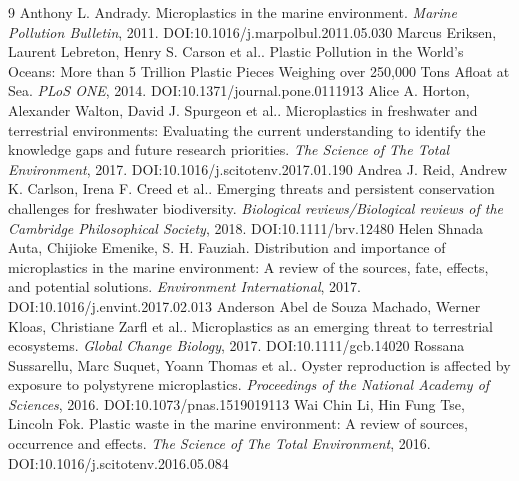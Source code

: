 \documentclass[11pt]{article}
\begin{document}
\begin{thebibliography}{9}
 Anthony L. Andrady. Microplastics in the marine environment. \emph{Marine Pollution Bulletin}, 2011. DOI:10.1016/j.marpolbul.2011.05.030
 Marcus Eriksen, Laurent Lebreton, Henry S. Carson et al.. Plastic Pollution in the World's Oceans: More than 5 Trillion Plastic Pieces Weighing over 250,000 Tons Afloat at Sea. \emph{PLoS ONE}, 2014. DOI:10.1371/journal.pone.0111913
 Alice A. Horton, Alexander Walton, David J. Spurgeon et al.. Microplastics in freshwater and terrestrial environments: Evaluating the current understanding to identify the knowledge gaps and future research priorities. \emph{The Science of The Total Environment}, 2017. DOI:10.1016/j.scitotenv.2017.01.190
 Andrea J. Reid, Andrew K. Carlson, Irena F. Creed et al.. Emerging threats and persistent conservation challenges for freshwater biodiversity. \emph{Biological reviews/Biological reviews of the Cambridge Philosophical Society}, 2018. DOI:10.1111/brv.12480
 Helen Shnada Auta, Chijioke Emenike, S. H. Fauziah. Distribution and importance of microplastics in the marine environment: A review of the sources, fate, effects, and potential solutions. \emph{Environment International}, 2017. DOI:10.1016/j.envint.2017.02.013
 Anderson Abel de Souza Machado, Werner Kloas, Christiane Zarfl et al.. Microplastics as an emerging threat to terrestrial ecosystems. \emph{Global Change Biology}, 2017. DOI:10.1111/gcb.14020
 Rossana Sussarellu, Marc Suquet, Yoann Thomas et al.. Oyster reproduction is affected by exposure to polystyrene microplastics. \emph{Proceedings of the National Academy of Sciences}, 2016. DOI:10.1073/pnas.1519019113
 Wai Chin Li, Hin Fung Tse, Lincoln Fok. Plastic waste in the marine environment: A review of sources, occurrence and effects. \emph{The Science of The Total Environment}, 2016. DOI:10.1016/j.scitotenv.2016.05.084
\end{thebibliography}
\end{document}

